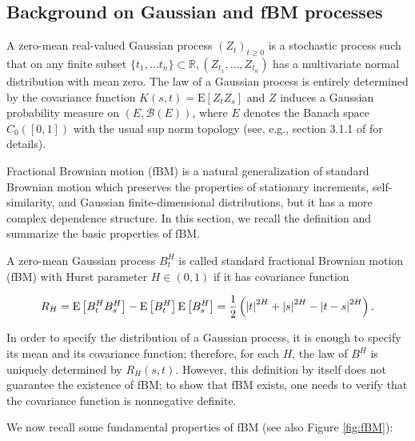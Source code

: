 \documentclass[11pt]{article}
\newcommand{\expt}[1]{\mathrm{E}\left[#1\right]}
\newcommand{\rset}{\mathbb{R}}
\begin{document}
\subsection{Background on Gaussian and fBM processes}
A zero-mean real-valued Gaussian process $(Z_t)_{t\ge0}$ is a stochastic process such that on any finite subset $\{t_1,\dots t_n\} \subset \rset, (Z_{t_1},\dots, Z_{t_n})$ has a
multivariate normal distribution with mean zero. The law of a Gaussian process is entirely determined by the covariance function $K(s, t)= \expt{Z_t Z_s}$ and $Z$ induces a Gaussian probability
measure on $(E, \mathcal{B}(E))$, where $E$ denotes the Banach space $C_0([0,1])$ with the usual sup norm topology (see, e.g., section 3.1.1 of  \cite{carmona2007interest} for details).



Fractional Brownian motion (fBM) is a natural generalization of standard Brownian motion which preserves the properties of stationary increments, self-similarity, and Gaussian finite-dimensional distributions, but it has a more complex dependence structure. In this section, we recall the definition and summarize the basic properties of fBM.

A zero-mean Gaussian process $B^H_t$ is called standard fractional Brownian motion (fBM) with Hurst parameter $H \in(0,1)$ if it has covariance function

\begin{align}\label{eq:fbm_cov}
R_H=\expt{B_t^H B_s^H}-\expt{B_t^H}\expt{B_s^H}=\frac{1}{2} \left(\abs{t}^{2H}+\abs{s}^{2H}-\abs{t-s}^{2H}\right).	
\end{align}



In order to specify the distribution of a Gaussian process, it is enough to specify its mean and its covariance function; therefore, for each $H$, the law of $B^H$ is uniquely determined by $R_H(s, t)$. However, this definition by itself does not guarantee the existence of fBM; to show that fBM exists, one needs to verify that the covariance function is nonnegative definite.

We now recall some fundamental properties of fBM (see also Figure \ref{fig:fBM}):
\end{document}
